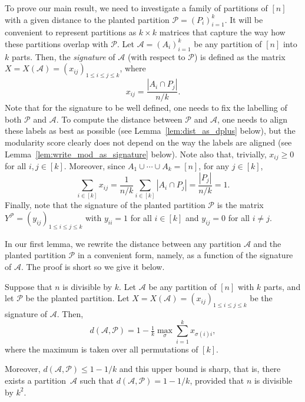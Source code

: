 \documentclass[a4paper,UKenglish,cleveref, autoref, thm-restate,numberwithinsect]{lipics-v2021}
\newcommand{\cA}{\mathcal{A}}
\newcommand{\cP}{\mathcal{P}}
\begin{document}
To prove our main result, we need to investigate a family of partitions of $[n]$ with a given distance to the planted partition $\cP = (P_i)_{i=1}^k$. It will be convenient to represent partitions as $k \times k$ matrices that capture the way how these partitions overlap with $\cP$. Let $\cA = (A_i)_{i=1}^k$ be any partition of $[n]$ into $k$ parts. Then, the \emph{signature} of $\cA$ (with respect to $\cP$) is defined as the matrix $X = X(\cA) =(x_{ij})_{1\leq i\leq j \leq k}$, where 
\begin{equation}\label{eq:signature}
x_{ij} = \frac {|A_i \cap P_j|}{n/k}.
\end{equation}
Note that for the signature to be well defined, one needs to fix the labelling of both $\cP$ and $\cA$. To compute the distance between $\cP$ and $\cA$, one needs to align these labels as best as possible (see Lemma~\ref{lem:dist_as_dplus} below), but the modularity score clearly does not depend on the way the labels are aligned (see Lemma~\ref{lem:write_mod_as_signature} below).
Note also that, trivially, $x_{ij} \ge 0$ for all $i,j \in [k]$. Moreover, since $A_1 \cup \cdots \cup A_k = [n]$, for any $j \in [k]$,
\begin{equation}\label{eq:sum1}
\sum_{i \in [k]} x_{ij}  = \frac {1}{n/k} \sum_{i \in [k]} |A_i \cap P_j| = \frac {|P_j|}{n/k} = 1.
\end{equation}
Finally, note that the signature of the planted partition $\cP$ is the matrix $Y^{\cP}=(y_{ij})_{1\leq i \leq j \leq k}$ with $y_{ii}=1$ for all $i \in [k]$ and $y_{ij}=0$ for all $i\neq j$.

In our first lemma, we rewrite the distance between any partition $\cA$ and the planted partition $\cP$ in a convenient form, namely, as a function of the signature of $\cA$. The proof is short so we give it below. %

\begin{lemma}\label{lem:dist_as_dplus}
Suppose that $n$ is divisible by $k$. 
Let $\cA$ be any partition of $[n]$ with $k$ parts, and let $\cP$ be the planted partition.
Let $X=X(\cA)=(x_{ij})_{1\leq i \leq j \leq k}$ be the signature of $\cA$. Then,
\begin{equation}\label{eq:dist_as_dplus}
d(\cA, \cP) = 1-\tfrac{1}{k}\max_{\sigma} \sum_{i=1}^k x_{\sigma(i) i}, 
\end{equation}
where the maximum is taken over all permutations of $[k]$. 

Moreover, $d(\cA, \cP) \leq 1 -1/k$ and this upper bound is sharp, that is, there exists a partition~$\cA$ such that $d(\cA, \cP) = 1 -1/k$, provided that $n$ is divisible by $k^2$. 
\end{lemma}
\end{document}
